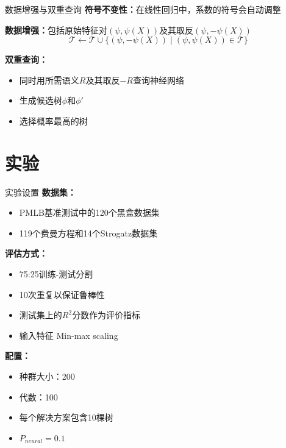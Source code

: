 \documentclass[aspectratio=1610]{beamer}
\begin{document}
    \begin{frame}{数据增强与双重查询}
        \textbf{符号不变性：}在线性回归中，系数的符号会自动调整

        \textbf{数据增强：}包括原始特征对$(\psi, \psi(X))$及其取反$(\psi, -\psi(X))$
        \begin{equation}
            \mathcal{T} \gets \mathcal{T} \cup \{(\psi, -\psi(X)) \mid (\psi, \psi(X)) \in \mathcal{T}\}
        \end{equation}

        \textbf{双重查询：}
        \begin{itemize}
            \item 同时用所需语义$R$及其取反$-R$查询神经网络
            \item 生成候选树$\phi$和$\phi'$
            \item 选择概率最高的树
        \end{itemize}

    \end{frame}


    \section{实验}

    \begin{frame}{实验设置}
        \textbf{数据集：}
        \begin{itemize}
            \item PMLB基准测试中的120个黑盒数据集
            \item 119个费曼方程和14个Strogatz数据集
        \end{itemize}

        \textbf{评估方式：}
        \begin{itemize}
            \item 75:25训练-测试分割
            \item 10次重复以保证鲁棒性
            \item 测试集上的$R^2$分数作为评价指标
            \item 输入特征 Min-max scaling
        \end{itemize}

        \textbf{配置：}
        \begin{itemize}
            \item 种群大小：200
            \item 代数：100
            \item 每个解决方案包含10棵树
            \item $P_{neural} = 0.1$
        \end{itemize}
    \end{frame}
\end{document}
